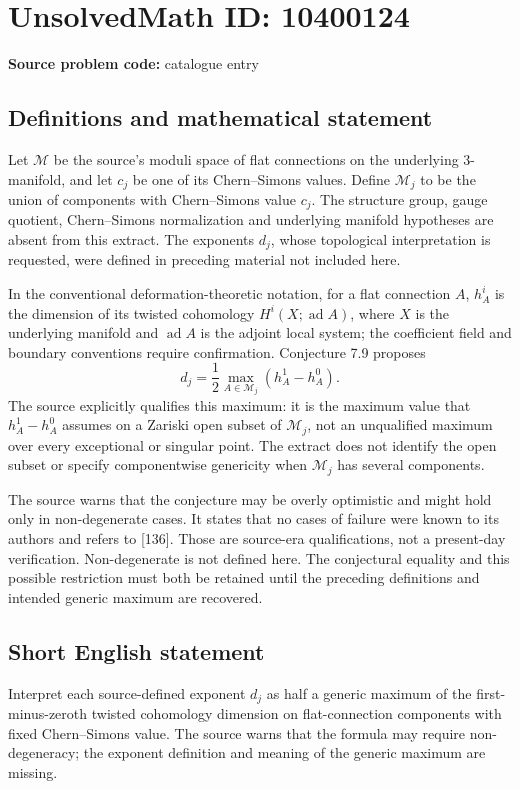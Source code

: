 \documentclass[11pt]{article}
\begin{document}
\section*{UnsolvedMath ID: 10400124}
\textbf{Source problem code:} catalogue entry
\subsection{Definitions and mathematical statement}
Let \(\mathcal M\) be the source's moduli space of flat connections on the underlying \(3\)-manifold, and let \(c_j\) be one of its Chern--Simons values. Define \(\mathcal M_j\) to be the union of components with Chern--Simons value \(c_j\). The structure group, gauge quotient, Chern--Simons normalization and underlying manifold hypotheses are absent from this extract. The exponents \(d_j\), whose topological interpretation is requested, were defined in preceding material not included here.

In the conventional deformation-theoretic notation, for a flat connection \(A\), \(h_A^i\) is the dimension of its twisted cohomology \(H^i(X;\operatorname{ad}A)\), where \(X\) is the underlying manifold and \(\operatorname{ad}A\) is the adjoint local system; the coefficient field and boundary conventions require confirmation. Conjecture 7.9 proposes
\[
 d_j=\frac12\max_{A\in\mathcal M_j}(h_A^1-h_A^0).
\]
The source explicitly qualifies this maximum: it is the maximum value that \(h_A^1-h_A^0\) assumes on a Zariski open subset of \(\mathcal M_j\), not an unqualified maximum over every exceptional or singular point. The extract does not identify the open subset or specify componentwise genericity when \(\mathcal M_j\) has several components.

The source warns that the conjecture may be overly optimistic and might hold only in non-degenerate cases. It states that no cases of failure were known to its authors and refers to [136]. Those are source-era qualifications, not a present-day verification. Non-degenerate is not defined here. The conjectural equality and this possible restriction must both be retained until the preceding definitions and intended generic maximum are recovered.
\subsection{Short English statement}
Interpret each source-defined exponent \(d_j\) as half a generic maximum of the first-minus-zeroth twisted cohomology dimension on flat-connection components with fixed Chern--Simons value. The source warns that the formula may require non-degeneracy; the exponent definition and meaning of the generic maximum are missing.
\end{document}
